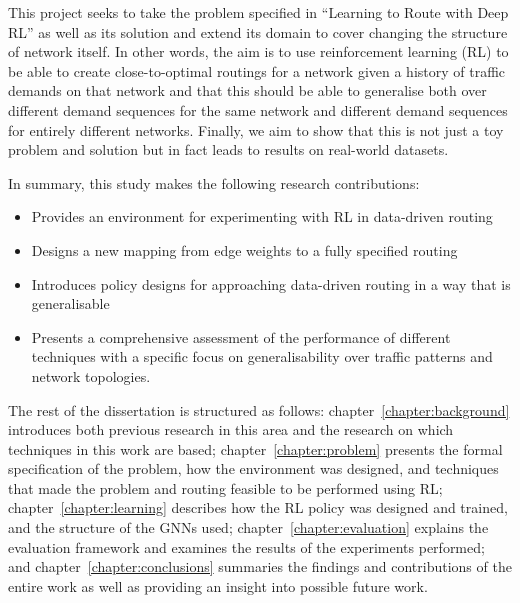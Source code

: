 This project seeks to take the problem specified in ``Learning to Route with Deep RL'' as well as its solution and extend its domain to cover changing the structure of network itself. In other words, the aim is to use reinforcement learning (RL) to be able to create close-to-optimal routings for a network given a history of traffic demands on that network and that this should be able to generalise both over different demand sequences for the same network and different demand sequences for entirely different networks. Finally, we aim to show that this is not just a toy problem and solution but in fact leads to results on real-world datasets.

In summary, this study makes the following research contributions:
\begin{itemize}
  \item Provides an environment for experimenting with RL in data-driven routing
  \item Designs a new mapping from edge weights to a fully specified routing
  \item Introduces policy designs for approaching data-driven routing in a way that is generalisable
  \item Presents a comprehensive assessment of the performance of different techniques with a specific focus on generalisability over traffic patterns and network topologies.
\end{itemize}

The rest of the dissertation is structured as follows: chapter~\ref{chapter:background} introduces both previous research in this area and the research on which techniques in this work are based; chapter~\ref{chapter:problem} presents the formal specification of the problem, how the environment was designed, and techniques that made the problem and routing feasible to be performed using RL; chapter~\ref{chapter:learning} describes how the RL policy was designed and trained, and the structure of the GNNs used; chapter~\ref{chapter:evaluation} explains the evaluation framework and examines the results of the experiments performed; and chapter~\ref{chapter:conclusions} summaries the findings and contributions of the entire work as well as providing an insight into possible future work.
